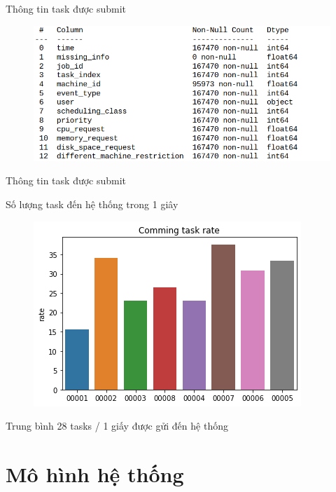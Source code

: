 \documentclass[10pt,xcolor={dvipsnames}]{beamer}
\begin{document}
	\begin{frame}
	{Thông tin task được submit}
	\begin{figure}
		\centering
		\includegraphics[scale=0.5]{images/task_event_schema.png}
	\end{figure}
	\end{frame}
	
	\begin{frame}
	{Thông tin task được submit}
	\begin{block}
	{Số lượng task đến hệ thống trong 1 giây}
	\begin{figure}
		\centering
		\includegraphics[scale=0.45]{images/comming_task_rate.png}
	\end{figure}
	\end{block}
	
	\begin{block}
	{Trung bình}
	28 tasks / 1 giấy được gửi đến hệ thống
	\end{block}
	\end{frame}
	
	\section{Mô hình hệ thống}
	
\end{document}
